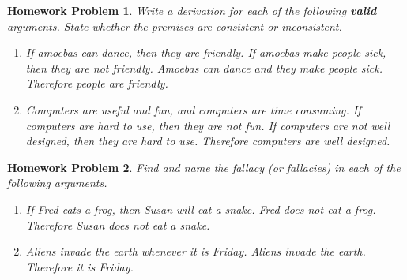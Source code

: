 \documentclass{article}
\newtheorem{hw}{Homework Problem}
\begin{document}
	\begin{hw}
		Write a derivation for each of the following \textbf{valid} arguments. State whether the premises are consistent or inconsistent.
		\begin{enumerate}
			\item If amoebas can dance, then they are friendly. If amoebas make people sick, then they are not friendly. Amoebas can dance and they make people sick. Therefore people are friendly.
			\item Computers are useful and fun, and computers are time consuming. If computers are hard to use, then they are not fun. If computers are not well designed, then they are hard to use. Therefore computers are well designed.
		\end{enumerate}
	\end{hw}
	\begin{hw}
		Find and name the fallacy (or fallacies) in each of the following arguments.
		\begin{enumerate}
			\item If Fred eats a frog, then Susan will eat a snake. Fred does not eat a frog. Therefore Susan does not eat a snake.
			\item Aliens invade the earth whenever it is Friday. Aliens invade the earth. Therefore it is Friday.
		\end{enumerate}
	\end{hw}


	\underline{\hspace{5in}}
\end{document}
